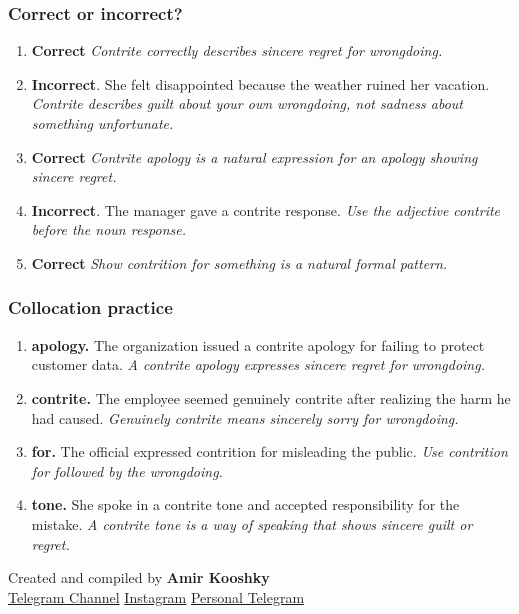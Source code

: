 \documentclass[11pt]{article}
\begin{document}
\subsubsection{Correct or incorrect?}
\begin{enumerate}
  \item \textbf{Correct} \emph{Contrite correctly describes sincere regret for wrongdoing.}
  \item \textbf{Incorrect}. She felt disappointed because the weather ruined her vacation. \emph{Contrite describes guilt about your own wrongdoing, not sadness about something unfortunate.}
  \item \textbf{Correct} \emph{Contrite apology is a natural expression for an apology showing sincere regret.}
  \item \textbf{Incorrect}. The manager gave a contrite response. \emph{Use the adjective contrite before the noun response.}
  \item \textbf{Correct} \emph{Show contrition for something is a natural formal pattern.}
\end{enumerate}

\subsubsection{Collocation practice}
\begin{enumerate}
  \item \textbf{apology.} The organization issued a contrite apology for failing to protect customer data. \emph{A contrite apology expresses sincere regret for wrongdoing.}
  \item \textbf{contrite.} The employee seemed genuinely contrite after realizing the harm he had caused. \emph{Genuinely contrite means sincerely sorry for wrongdoing.}
  \item \textbf{for.} The official expressed contrition for misleading the public. \emph{Use contrition for followed by the wrongdoing.}
  \item \textbf{tone.} She spoke in a contrite tone and accepted responsibility for the mistake. \emph{A contrite tone is a way of speaking that shows sincere guilt or regret.}
\end{enumerate}

\vfill
\begin{center}
\small\color{Muted} Created and compiled by \textbf{Amir Kooshky}\\
\href{https://t.me/KooshkyTOEFL}{Telegram Channel}\quad\textbullet\quad
\href{https://www.instagram.com/kooshkytoefl}{Instagram}\quad\textbullet\quad
\href{https://t.me/KooshkyTOEFL\_pv}{Personal Telegram}
\end{center}
\end{document}
